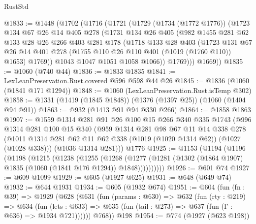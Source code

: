 \begin{lexlean}{RustStd}
\begin{coremodule}
@1833 := @1448
    (@1702
      (@1716
        (@1721
          (@1729
            (@1734 (@1772 @1776))
            (@1723
              @134
              @67
              @26
              @14
              @405
              @278
              (@1731
                @134
                @26
                @405
                (@982
                  @1455
                  @281
                  @62
                  @133
                  @28
                  @26
                  @266
                  @403
                  @281
                  @178
                  (@1718
                    @133
                    @28
                    @403
                    (@1723
                      @131
                      @67
                      @26
                      @14
                      @401
                      @278
                      (@1755 @110 @26 @110 @401 (@1019 (@1760 @110)) @1653)
                      @1769))
                  @1043
                  @1047
                  @1051
                  @1058
                  @1066))
              @1769)))
        @1669))
@1835 := @1060 (@740 @44)
@1836 := @1833 @1835
@1841 := LexLeanPreservation.Rust.covered @596 @598 @44 @26
@1845 := @1836 (@1060 (@1841 @171 @1294))
@1848 := @1060 (LexLeanPreservation.Rust.isTemp @302)
@1858 := @1331 (@1419 (@1845 @1848)) (@1376 (@1397 @25)) (@1060 (@1404 @94 @91))
@1863 := @932 (@1413 @91 @94 @330 @266)
@1864 := @1858 @1863
@1907 := @1559
    @1314
    @281
    @91
    @26
    @100
    @15
    @266
    @340
    @335
    @1743
    (@996
      @1314
      @281
      @100
      @15
      @340
      (@959
        @1314
        @281
        @98
        @67
        @11
        @14
        @338
        @278
        (@1011 @1314 @281 @62 @11 @62 @338 (@1019 (@1020 @1314 @62)) (@1027 (@1028 @338)))
        (@1036 @1314 @281)))
    @1776
@1925 := @1153
    (@1194
      (@1196
        (@1198
          (@1215
            (@1238
              (@1255
                (@1268
                  (@1277
                    (@1281 (@1302 (@1864 @1907) @1835 (@1060 (@1841 @176 @1294)) @1848))))))))))
@1926 := @601 @74
@1927 := @609 @1099
@1929 := @605 (@1927 @625)
@1931 := @648 (@649 @74)
@1932 := @644 @1931
@1934 := @605 (@1932 @674)
@1951 := @604
    (fun (fn : @39) =>
    @1929
      (@628
        (@631
          (fun (params : @630) =>
          @632
            (fun (rty : @219) =>
            @634
              (fun (lets : @633) =>
              @635 (fun (tail : @273) => @637 (fun (Γ : @636) => @1934 @721))))))
        @768))
    @198
@1954 := @774 (@1927 (@623 @198))

\end{coremodule}
\end{lexlean}
